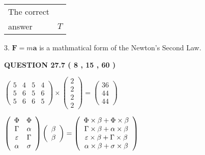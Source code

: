 \documentclass[12pt]{article}
\begin{document}
\noindent\begin{tabular}{|l|l|}\hline The correct & \\
          answer &  %
$T$ \\ \hline \end{tabular}
3.  %
$\mathbf{F}=m\mathbf{a}$ is a mathmatical form of  %
the Newton's Second Law.
 
  
  
{\textbf{\large{QUESTION
27.7 
 (           8 ,          15 ,          60 )
}}}

 
$\left( \begin{array}{ccccccccccccccc}
           5  & 
           4  & 
           5  & 
           4  \\ 
           5  & 
           6  & 
           5  & 
           6  \\ 
           5  & 
           6  & 
           6  & 
           5
\end{array}\right) \times
\left( \begin{array}{c}
           2  \\ 
           2  \\ 
           2  \\ 
           2
\end{array}\right)  =
\left( \begin{array}{c}
          36  \\ 
          44  \\ 
          44
\end{array}\right)  $
 
$  %
 \left( \begin{array}
 {
 c
 c
 }
 \Phi & 
 \Phi \\ 
 \Gamma & 
 \alpha \\ 
 \varepsilon & 
 \Gamma \\ 
 \alpha & 
 \sigma
 \end{array} \right)
 \left( \begin{array}
 {
 c
 }
 \beta \\ 
 \beta
 \end{array} \right)
=
 \left( \begin{array}
 {
 c
 }
  \Phi \times  \beta +  \Phi \times  \beta \\ 
  \Gamma \times  \beta +  \alpha \times  \beta \\ 
  \varepsilon \times  \beta +  \Gamma \times  \beta \\ 
  \alpha \times  \beta +  \sigma \times  \beta
 \end{array} \right)
$
 
\end{document}
